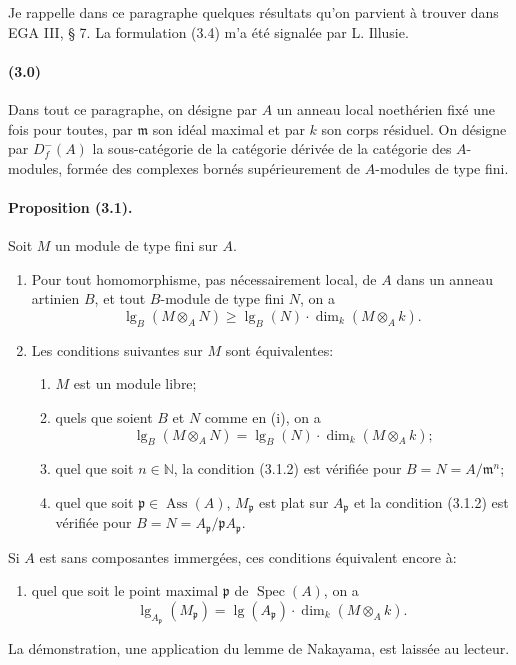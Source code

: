 \documentclass[10pt]{article}
\providecommand{\N}{\mathbb N}
\providecommand{\Spec}{\operatorname{Spec}}
\providecommand{\lgop}{\operatorname{lg}}
\begin{document}
Je rappelle dans ce paragraphe quelques résultats qu'on parvient à trouver dans EGA III, § 7. La formulation (3.4) m'a été signalée par L. Illusie.

\paragraph{(3.0)} Dans tout ce paragraphe, on désigne par $A$ un anneau local noethérien fixé une fois pour toutes, par $\mathfrak m$ son idéal maximal et par $k$ son corps résiduel. On désigne par $D_f^-(A)$ la sous-catégorie de la catégorie dérivée de la catégorie des $A$-modules, formée des complexes bornés supérieurement de $A$-modules de type fini.

\paragraph{Proposition (3.1).} Soit $M$ un module de type fini sur $A$.
\begin{enumerate}[label=(\roman*)]
\item Pour tout homomorphisme, pas nécessairement local, de $A$ dans un anneau artinien $B$, et tout $B$-module de type fini $N$, on a
\[
\tag{3.1.1}
\operatorname{lg}_B(M\otimes_A N)\ge
\operatorname{lg}_B(N)\cdot\dim_k(M\otimes_A k).
\]
\item Les conditions suivantes sur $M$ sont équivalentes:
\begin{enumerate}[label=\alph*)]
\item $M$ est un module libre;
\item quels que soient $B$ et $N$ comme en (i), on a
\[
\tag{3.1.2}
\operatorname{lg}_B(M\otimes_A N)=
\operatorname{lg}_B(N)\cdot\dim_k(M\otimes_A k);
\]
\item quel que soit $n\in\N$, la condition (3.1.2) est vérifiée pour $B=N=A/\mathfrak m^n$;
\item quel que soit $\mathfrak p\in\operatorname{Ass}(A)$, $M_\mathfrak p$ est plat sur $A_\mathfrak p$ et la condition (3.1.2) est vérifiée pour $B=N=A_\mathfrak p/\mathfrak pA_\mathfrak p$.
\end{enumerate}
\end{enumerate}



Si $A$ est sans composantes immergées, ces conditions équivalent encore à:
\begin{enumerate}[label=\alph*),start=5]
\item quel que soit le point maximal $\mathfrak p$ de $\Spec(A)$, on a
\[
\tag{3.1.2'}
\lgop_{A_\mathfrak p}(M_\mathfrak p)=\lgop(A_\mathfrak p)\cdot
\dim_k(M\otimes_A k).
\]
\end{enumerate}
La démonstration, une application du lemme de Nakayama, est laissée au lecteur.
\end{document}
